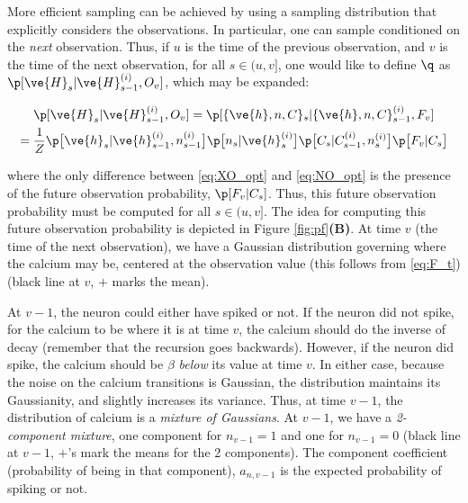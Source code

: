 %

More efficient sampling can be achieved by using a sampling distribution that explicitly considers the observations.  In particular, one can sample conditioned on the \emph{next} observation.  Thus, if $u$ is the time of the previous observation, and $v$ is the time of the next observation, for all $s \in(u,v]$, one would like to define $\q$ as $\p[\ve{H}_s|\ve{H}_{s-1}^{(i)},O_v]$, which may be expanded:

\begin{multline} \label{eq:XO_opt}
\p[\ve{H}_s|\ve{H}_{s-1}^{(i)},O_v] = \p [\{\ve{h},n,C\}_s | \{\ve{h},n,C\}_{s-1}^{(i)}, F_v]
\\ = \frac{1}{Z} \p \big[ \ve{h}_s | \ve{h}^{(i)}_{s-1}, n_{s-1}^{(i)} \big] \p \big[ n_s | \ve{h}^{(i)}_{s} \big] \p \big[ C_s | C^{(i)}_{s-1}, n_s^{(i)} \big] \p \big[ F_v | C_s \big]
\end{multline}

\noindent where the only difference between \eqref{eq:XO_opt} and \eqref{eq:NO_opt} is the presence of the future observation probability,  $\p[F_v | C_s]$.  Thus, this future observation probability must be computed for all $s \in(u,v]$.  The idea for computing this future observation probability is depicted in Figure \ref{fig:pf}\textbf{(B)}.  At time $v$ (the time of the next observation), we have a Gaussian distribution governing where the calcium may be, centered at the observation value (this follows from \eqref{eq:F_t}) (black line at $v$, $+$ marks the mean). 

At $v-1$, the neuron could either have spiked or not.  If the neuron did not spike, for the calcium to be where it is at time $v$, the calcium should do the inverse of decay (remember that the recursion goes backwards).  However, if the neuron did spike, the calcium should be $\beta$ \emph{below} its value at time $v$.  In either case, because the noise on the calcium transitions is Gaussian, the distribution maintains its Gaussianity, and slightly increases its variance.  Thus, at time $v-1$, the distribution of calcium is a \emph{mixture of Gaussians}.  At $v-1$, we have a \emph{2-component mixture}, one component for $n_{v-1}=1$ and one for $n_{v-1}=0$ (black line at $v-1$, $+$'s mark the means for the 2 components). The component coefficient (probability of being in that component), $a_{n,v-1}$ is the expected probability of spiking or not.

